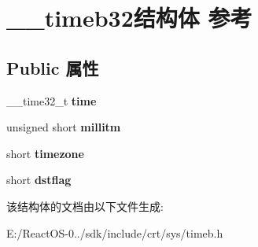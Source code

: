 \hypertarget{struct____timeb32}{}\section{\+\_\+\+\_\+timeb32结构体 参考}
\label{struct____timeb32}
\subsection*{Public 属性}
\begin{DoxyCompactItemize}
\item 
\mbox{\label{struct____timeb32_a0f48f2ac14f8c4ec3e77683e0608476a}} 
\+\_\+\+\_\+time32\+\_\+t {\bfseries time}
\item 
\mbox{\label{struct____timeb32_afcc9d7bc7230c3f84d519dddc6875349}} 
unsigned short {\bfseries millitm}
\item 
\mbox{\label{struct____timeb32_a0a378e1ab4625e7b5ce921c4abe38795}} 
short {\bfseries timezone}
\item 
\mbox{\label{struct____timeb32_a6c3d69f51c85369c25776c656ae144dd}} 
short {\bfseries dstflag}
\end{DoxyCompactItemize}


该结构体的文档由以下文件生成\+:\begin{DoxyCompactItemize}
\item 
E\+:/\+React\+O\+S-\/0../sdk/include/crt/sys/timeb.\+h\end{DoxyCompactItemize}
